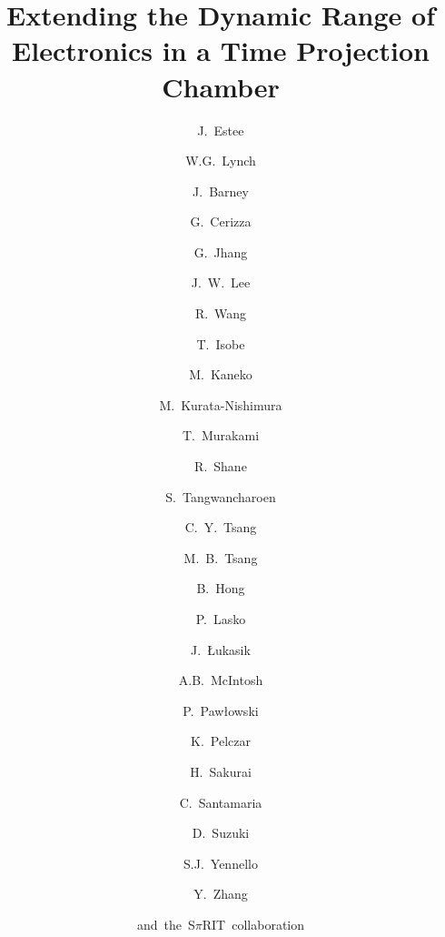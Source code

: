 \documentclass[review,number,sort&compress]{elsarticle}
\begin{document}
\begin{frontmatter}

\title{Extending the Dynamic Range of Electronics in a Time Projection Chamber}


\author[nscl,msu]{J.~Estee}
\author[nscl,msu]{W.G.~Lynch}
\author[nscl,msu]{J.~Barney}
\author[nscl,msu]{G.~Cerizza}
\author[nscl]{G.~Jhang}
\author[kor]{J.~W.~Lee}
\author[nscl]{R.~Wang}
\author[riken]{T.~Isobe}
\author[kyoto]{M.~Kaneko}
\author[riken]{M.~Kurata-Nishimura}
\author[kyoto]{T.~Murakami}
\author[nscl]{R.~Shane}
\author[nscl]{S.~Tangwancharoen}
\author[nscl]{C.~Y.~Tsang}
\author[nscl]{M.~B.~Tsang}
\author[kor]{B.~Hong}
\author[krakow]{P.~Lasko}
\author[krakow]{J.~\L ukasik}
\author[a&m]{A.B.~McIntosh}
\author[krakow]{P.~Paw\l owski}
\author[poland]{K.~Pelczar}
\author[riken]{H.~Sakurai}
\author[nscl]{C.~Santamaria}
\author[riken]{D.~Suzuki}
\author[a&m2]{S.J.~Yennello}
\author[tsing]{Y.~Zhang}
\author[]{and~the~S$\pi$RIT~collaboration}

\address[nscl]{National Superconducting Cyclotron Laboratory, East Lansing, Michigan, 48824, USA}
\address[msu]{Department of Physics and Astronomy, Michigan State University, East Lansing, Michigan, 48824, USA }
\address[kor]{Department of Physics, Korea University, Seoul 02841, Republic of Korea }
\address[riken]{RIKEN Nishina Center, Hirosawa 2-1, Wako, Saitama 351-0198, Japan }
\address[kyoto]{Department of Physics, Kyoto University, Kita-shirakawa, Kyoto 606-8502, Japan }
\address[krakow]{Institute of Nuclear Physics PAN, ul. Radzikowskiego 152, 31-342 Krak\'{o}w, Poland}
\address[a&m]{Cyclotron Institute, Texas A$\&$M University, College Station, TX 77843, USA }
\address[a&m2]{Chemistry Department, Cyclotron Institute, Texas A$\&$M University, College Station, TX 77843, USA }
\address[tsing]{Department of Physics, Tsinghua University, Beijing 100084, P. R. China}
\address[poland]{Gran Sasso National Laboratory - INFN, Via G. Acitelli 22, 67100 Assergi, L'Aquila AQ, Italy}




\end{frontmatter}
\end{document}
